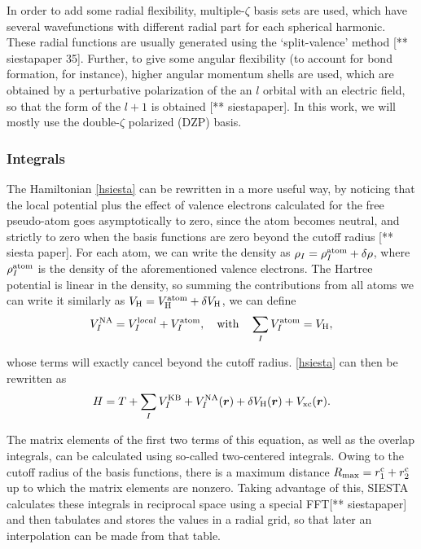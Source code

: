 In order to add some radial flexibility, multiple-\(\zeta\) basis sets are used, which have several wavefunctions with different radial part for each spherical harmonic. These radial functions are usually generated using the `split-valence' method [** siestapaper 35]. Further, to give some angular flexibility (to account for bond formation, for instance), higher angular momentum shells are used, which are obtained by a perturbative polarization of the an \(l\) orbital with an electric field, so that the form of the \(l+1\) is obtained [** siestapaper]. In this work, we will mostly use the double-\(\zeta\) polarized (DZP) basis.


\subsubsection*{Integrals}
 The Hamiltonian \ref{hsiesta} can be rewritten in a more useful way, by noticing that the local potential plus the effect of valence electrons calculated for the free pseudo-atom goes asymptotically to zero, since the atom becomes neutral, and strictly to zero when the basis functions are zero beyond the cutoff radius [** siesta paper]. For each atom, we can write the density as  \(\rho_I=\rho_I^{\mathrm{atom}}+\delta\rho\), where \(\rho_I^{\mathrm{atom}}\) is the density of the aforementioned valence electrons. The Hartree potential is linear in the density, so summing the contributions from all atoms we can write it similarly as \(V_{\mathrm{H}}=V_{\mathrm{H}}^{\mathrm{atom}}+\delta V_{\mathrm{H}}\), we can define
 \begin{equation}
 V_I^{\mathrm{NA}}=V_I^{\mathrm{l}ocal}+V_I^{\mathrm{atom}},\quad\mathrm{with}\quad\sum_IV_I^{\mathrm{atom}}=V_{\mathrm{H}},
 \end{equation}

whose terms will exactly cancel beyond the cutoff radius. \ref{hsiesta} can then be rewritten as
\begin{equation}
\label{hsiesta2}
H=T+\sum_{I}V_{I}^{\mathrm{KB}}+V_I^{\mathrm{NA}}(\bm{r})+\delta V_{\mathrm{H}}(\bm r)+V_{\mathrm{xc}}(\bm{r}).
\end{equation}

The matrix elements of the first two terms of this equation, as well as the overlap integrals, can be calculated using so-called two-centered integrals. Owing to the cutoff radius of the basis functions, there is a maximum distance \(R_{\mathrm{max}}=r_1^{\mathrm{c}}+r_2^{\mathrm{c}}\) up to which the matrix elements are nonzero. Taking advantage of this, SIESTA calculates these integrals in reciprocal space using a special FFT[** siestapaper] and then tabulates and stores the values in a radial grid, so that later an interpolation can be made from that table.

